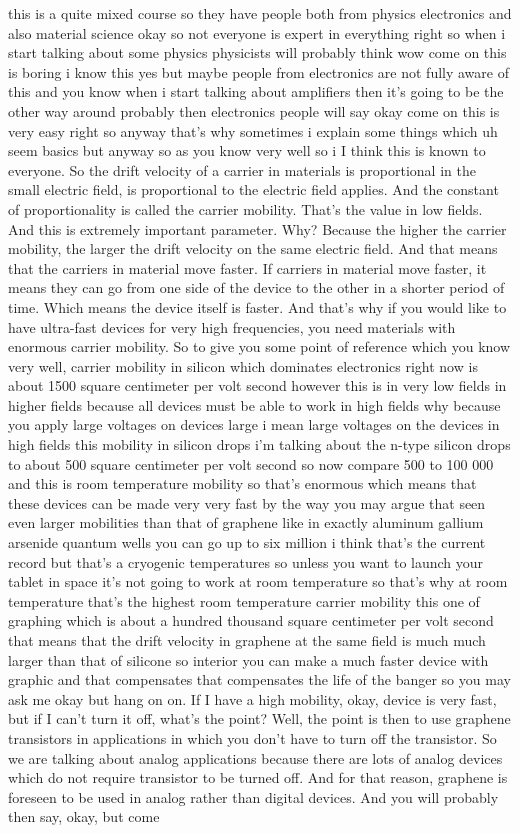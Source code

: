 this is a quite mixed course so they have people both from physics electronics and also material science okay so not everyone is expert in everything right so when i start talking about some physics physicists will probably think wow come on this is boring i know this yes but maybe people from electronics are not fully aware of this and you know when i start talking about amplifiers then it's going to be the other way around probably then electronics people will say okay come on this is very easy right so anyway that's why sometimes i explain some things which uh seem basics but anyway so as you know very well so i I think this is known to everyone. So the drift velocity of a carrier in materials is proportional in the small electric field, is proportional to the electric field applies. And the constant of proportionality is called the carrier mobility. That's the value in low fields. And this is extremely important parameter. Why? Because the higher the carrier mobility, the larger the drift velocity on the same electric field. And that means that the carriers in material move faster. If carriers in material move faster, it means they can go from one side of the device to the other in a shorter period of time. Which means the device itself is faster. And that's why if you would like to have ultra-fast devices for very high frequencies, you need materials with enormous carrier mobility. So to give you some point of reference which you know very well, carrier mobility in silicon which dominates electronics right now is about 1500 square centimeter per volt second however this is in very low fields in higher fields because all devices must be able to work in high fields why because you apply large voltages on devices large i mean large voltages on the devices in high fields this mobility in silicon drops i'm talking about the n-type silicon drops to about 500 square centimeter per volt second so now compare 500 to 100 000 and this is room temperature mobility so that's enormous which means that these devices can be made very very fast by the way you may argue that seen even larger mobilities than that of graphene like in exactly aluminum gallium arsenide quantum wells you can go up to six million i think that's the current record but that's a cryogenic temperatures so unless you want to launch your tablet in space it's not going to work at room temperature so that's why at room temperature that's the highest room temperature carrier mobility this one of graphing which is about a hundred thousand square centimeter per volt second that means that the drift velocity in graphene at the same field is much much larger than that of silicone so interior you can make a much faster device with graphic and that compensates that compensates the life of the banger so you may ask me okay but hang on on. If I have a high mobility, okay, device is very fast, but if I can't turn it off, what's the point? Well, the point is then to use graphene transistors in applications in which you don't have to turn off the transistor. So we are talking about analog applications because there are lots of analog devices which do not require transistor to be turned off. And for that reason, graphene is foreseen to be used in analog rather than digital devices. And you will probably then say, okay, but come 